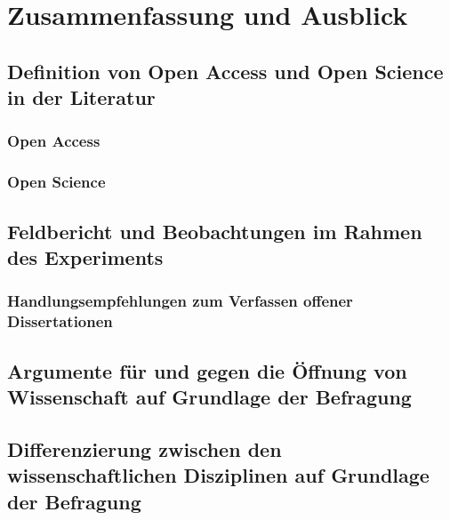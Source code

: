 \chapter{Zusammenfassung und Ausblick}

\section{Definition von Open Access und Open Science in der Literatur}
\subsection{Open Access}
\subsection{Open Science}
\section{Feldbericht und Beobachtungen im Rahmen des Experiments}
\subsection{Handlungsempfehlungen zum Verfassen offener Dissertationen}
\section{Argumente für und gegen die Öffnung von Wissenschaft auf Grundlage der Befragung}
\section{Differenzierung zwischen den wissenschaftlichen Disziplinen auf Grundlage der Befragung}